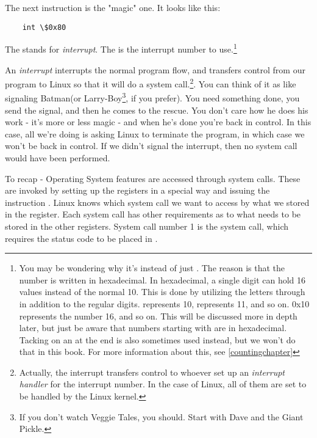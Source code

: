 The next instruction is the "magic" one.  It looks like this:

\begin{simpletyping}
\begin{lstlisting}
	int \$0x80
\end{lstlisting}
\end{simpletyping}

The  stands for 
\emph{interrupt}.  The
 is the interrupt 
number to use.\footnote{You
may be wondering why it's  instead of just 
.  The reason is that the number is written in 
hexadecimal.  In hexadecimal, a single digit can hold 16 values instead
of the normal 10.  This is done by utilizing the letters 
 through 
in addition to the regular digits.   represents 10,
 represents 11, and so on.  0x10 represents the number
16, and so on.  This will be discussed more in depth later, but just be
aware that numbers starting with  are in hexadecimal.
Tacking on an  at the end is also sometimes used instead, but
we won't do that in this book.  For more information about this, see \autoref{countingchapter}
}

An \emph{interrupt} interrupts the normal program flow, and
transfers control from our program to Linux so that it will do a system
call.\footnote{Actually, the
interrupt transfers control to whoever set up an \emph{interrupt
handler} for the interrupt number.  In the case of Linux,
all of them are set to be handled by the Linux kernel.}.
You can think of it as like signaling Batman(or 
Larry-Boy\footnote{If you don't watch Veggie Tales, you should.  Start with Dave and the Giant Pickle.}, if you prefer).
You need something done,
you send the signal, and then he comes to the rescue.  You don't care how
he does his work - it's more or less magic - and when he's done you're
back in control.  In this case, all we're doing is asking Linux to 
terminate the program, in which case we won't be back in control.  
If we didn't signal the interrupt, then no system call would have been
performed.

\begin{sidebar}
To recap - Operating System features are accessed through
system calls.  These are invoked by setting up the registers
in a special way and issuing the instruction .
Linux knows which system call we want to access by what we stored
in the {\eaxRegIdx} register.  Each system call has other requirements
as to what needs to be stored in the other registers.  System call
number 1 is the  system call, which requires
the status code
to be placed in {\ebxRegIdx}.
\end{sidebar}

